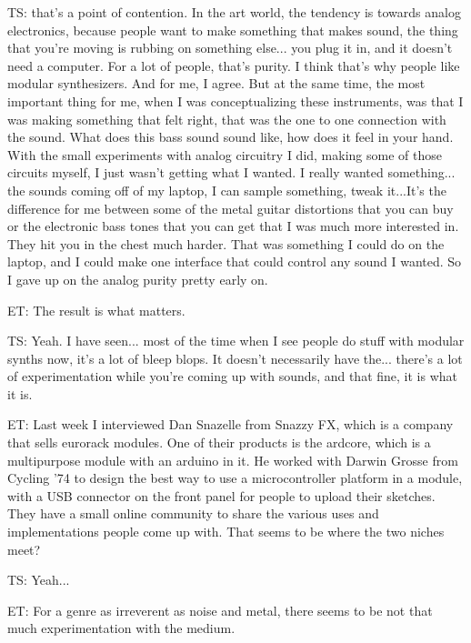 TS: that's a point of contention. In the art world, the tendency is towards analog electronics, because people want to make something that makes sound, the thing that you're moving is rubbing on something else... you plug it in, and it doesn't need a computer. For a lot of people, that's purity. I think that's why people like modular synthesizers. And for me, I agree. But at the same time, the most important thing for me, when I was conceptualizing these instruments, was that I was making something that felt right, that was the one to one connection with the sound. What does this bass sound sound like, how does it feel in your hand. With the small experiments with analog circuitry I did, making some of those circuits myself, I just wasn't getting what I wanted. I really wanted something... the sounds coming off of my laptop, I can sample something, tweak it...It's the difference for me between some of the metal guitar distortions that you can buy or the electronic bass tones that you can get that I was much more interested in. They hit you in the chest much harder. That was something I could do on the laptop, and I could make one interface that could control any sound I wanted. So I gave up on the analog purity pretty early on. 

ET: The result is what matters. 

TS: Yeah. I have seen... most of the time when I see people do stuff with modular synths now, it's a lot of bleep blops. It doesn't necessarily have the... there's a lot of experimentation while you're coming up with sounds, and that fine, it is what it is. 

ET: Last week I interviewed Dan Snazelle from Snazzy FX, which is a company that sells eurorack modules. One of their products is the ardcore, which is a multipurpose module with an arduino in it. He worked with Darwin Grosse from Cycling '74 to design the best way to use a microcontroller platform in a module, with a USB connector on the front panel for people to upload their sketches. They have a small online community to share the various uses and implementations people come up with. That seems to be where the two niches meet? 

TS: Yeah... 

ET: For a genre as irreverent as noise and metal, there seems to be not that much experimentation with the medium. 

